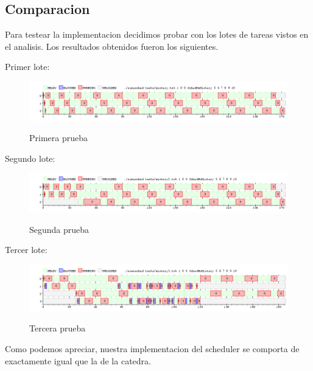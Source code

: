 \subsection{Comparacion}

Para testear la implementacion decidimos probar con los lotes de tareas vistos en el analisis. Los resultados obtenidos fueron los siguientes.

\pagebreak

Primer lote:

\begin{figure}[h]
    \includegraphics[width=\linewidth]{images/no_mist.png}
    \label{fig:Task Consola}
    \caption{Primera prueba}
\end{figure}

Segundo lote:

\begin{figure}[h]
    \includegraphics[width=\linewidth]{images/no_mist2.png}
    \label{fig:Task Consola}
    \caption{Segunda prueba}
\end{figure}

Tercer lote:

\begin{figure}[h]
    \includegraphics[width=\linewidth]{images/no_mist3.png}
    \label{fig:Task Consola}
    \caption{Tercera prueba}
\end{figure}

Como podemos apreciar, nuestra implementacion del scheduler se comporta de exactamente igual que la de la catedra.

